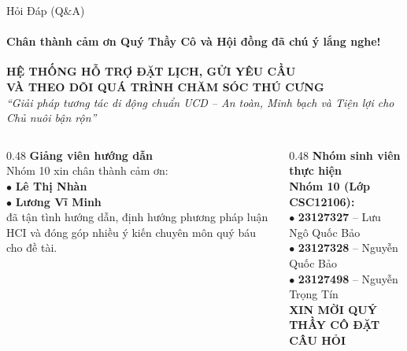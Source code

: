 \begin{frame}{Hỏi Đáp (Q\&A)}
  \framesubtitle{\color{white!90}\textbf{Chân thành cảm ơn Quý Thầy Cô và Hội đồng đã chú ý lắng nghe!}}

  \vspace{1mm}

  \begin{center}
    {\large \bfseries \color{PetcarePrimary} HỆ THỐNG HỖ TRỢ ĐẶT LỊCH, GỬI YÊU CẦU\\VÀ THEO DÕI QUÁ TRÌNH CHĂM SÓC THÚ CƯNG}\\[2mm]
    {\footnotesize \color{PetcareDark}\textit{``Giải pháp tương tác di động chuẩn UCD -- An toàn, Minh bạch và Tiện lợi cho Chủ nuôi bận rộn''}}
  \end{center}

  \vspace{2mm}

  \begin{columns}[T]
    \begin{column}{0.48\textwidth}
      {\color{PetcarePrimary}\large \textbf{Giảng viên hướng dẫn}}\\[2mm]
      \small
      Nhóm 10 xin chân thành cảm ơn:\\[1.5mm]
      $\bullet$ \textbf{Lê Thị Nhàn}\\
      $\bullet$ \textbf{Lương Vĩ Minh}\\[2mm]
      đã tận tình hướng dẫn, định hướng phương pháp luận HCI và đóng góp nhiều ý kiến chuyên môn quý báu cho đề tài.
    \end{column}

    \begin{column}{0.48\textwidth}
      {\color{PetcarePrimary}\large \textbf{Nhóm sinh viên thực hiện}}\\[2mm]
      \small
      \textbf{Nhóm 10 (Lớp CSC12106):}\\[1.5mm]
      $\bullet$ \textbf{23127327} -- Lưu Ngô Quốc Bảo\\
      $\bullet$ \textbf{23127328} -- Nguyễn Quốc Bảo\\
      $\bullet$ \textbf{23127498} -- Nguyễn Trọng Tín\\[4mm]
      \centering
      {\normalsize \bfseries \color{PetcarePrimary} XIN MỜI QUÝ THẦY CÔ ĐẶT CÂU HỎI}
    \end{column}
  \end{columns}
\end{frame}
